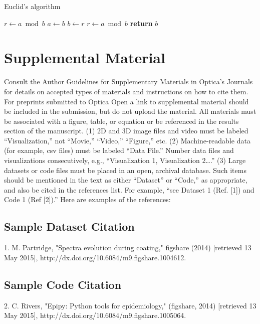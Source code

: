 \documentclass[9pt,twocolumn,twoside]{osajnl}
\begin{document}
\begin{algorithm}
\caption{Euclid’s algorithm}\label{alg:euclid}
\begin{algorithmic}[1]
\State $r\gets a\bmod b$
\State $a\gets b$
\State $b\gets r$
\State $r\gets a\bmod b$
\EndWhile\label{euclidendwhile}
\State \textbf{return} $b$
\EndProcedure
\end{algorithmic}
\end{algorithm}

\section{Supplemental Material}

Consult the Author Guidelines for Supplementary Materials in Optica's Journals for details on accepted types of materials and instructions on how to cite them. For preprints submitted to Optica Open a link to supplemental material should be included in the submission, but do not upload the material.
All materials must be associated with a figure, table, or equation or be referenced in the results section of the manuscript.
(1) 2D and 3D image files and video must be labeled “Visualization,” not “Movie,” “Video,” “Figure,” etc.
(2) Machine-readable data (for example, csv files) must be labeled  “Data File.”  Number data files and visualizations consecutively, e.g., “Visualization 1, Visualization 2….”
(3) Large datasets or code files must be placed in an open, archival database.  Such items should be mentioned in the text as either “Dataset” or “Code,” as appropriate, and also be cited in the references list.  For example, “see Dataset 1 (Ref. [1]) and Code 1 (Ref [2]).” Here are examples of the references:

\subsection{Sample Dataset Citation}

1. M. Partridge, "Spectra evolution during coating," figshare (2014) [retrieved 13 May 2015], http://dx.doi.org/10.6084/m9.figshare.1004612.

\subsection{Sample Code Citation}

2. C. Rivers, "Epipy: Python tools for epidemiology," (figshare, 2014) [retrieved 13 May 2015], http://dx.doi.org/10.6084/m9.figshare.1005064.
\end{document}
